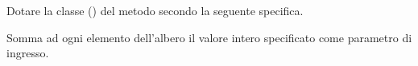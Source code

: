 Dotare la classe  () del metodo  secondo la seguente specifica.

\begin{methodslist}

 {
Somma ad ogni elemento dell'albero il valore intero specificato come parametro di ingresso.
}

\end{methodslist}
